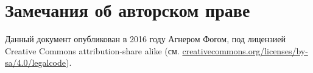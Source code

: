 \documentclass[forwardcom.tex]{subfiles}
\begin{document}
\chapter{Замечания об авторском праве}
Данный документ опубликован в 2016 году Агнером Фогом, под лицензией Creative Commons attribution-share alike (см. \href{http://creativecommons.org/licenses/by-sa/4.0/legalcode}{creativecommons.org/licenses/by-sa/4.0/legalcode}).
\end{document}

